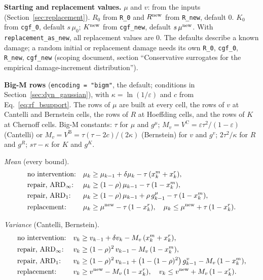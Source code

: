 \textbf{Starting and replacement values.} $\mu$ and $v$: from the inputs
(Section~\ref{sec:replacement}). $R_0$ from \texttt{R\_0} and $R^{\mathrm{new}}$ from
\texttt{R\_new}, default 0. $K_0$ from \texttt{cgf\_0}, default $s\,\mu_0$;
$K^{\mathrm{new}}$ from \texttt{cgf\_new}, default $s\,\mu^{\mathrm{new}}$. With
\texttt{replacement\_as\_new}, all replacement values are 0. The defaults describe a
known damage; a random initial or replacement damage needs its own \texttt{R\_0},
\texttt{cgf\_0}, \texttt{R\_new}, \texttt{cgf\_new} (scoping document, section
``Conservative surrogates for the empirical damage-increment distribution'').

\textbf{Big-M rows} (\texttt{encoding = "bigm"}, the default; conditions in
Section~\ref{sec:dyn_gaussian}), with $\kappa = \ln(1/\varepsilon)$ and $c$ from
Eq.~\eqref{eq:rf_bsupport}. The rows of $\mu$ are built at every cell, the rows of
$v$ at Cantelli and Bernstein cells, the rows of $R$ at Hoeffding cells, and the rows
of $K$ at Chernoff cells. Big-M constants: $\tau$ for $\mu$ and $g^{\mu}$;
$M_v = V^{\mathrm{C}} = \varepsilon\tau^2/(1-\varepsilon)$ (Cantelli) or
$M_v = V^{\mathrm{B}} = \tau(\tau - 2c)/(2\kappa)$ (Bernstein) for $v$ and $g^{v}$;
$2\tau^2/\kappa$ for $R$ and $g^{R}$; $s\tau - \kappa$ for $K$ and $g^{K}$.

\emph{Mean} (every bound).
\begin{align}
  &\text{no intervention:} & \mu_k &\geq \mu_{k-1} + \delta\mu_k - \tau\,(x^m_k + x^r_k),
    \label{eq:rf_mu_carry} \\
  &\text{repair, } \mathrm{ARD}_{\infty}\text{:} & \mu_k &\geq (1-\rho)\,\mu_{k-1} - \tau\,(1 - x^m_k),
    \label{eq:rf_mu_inf} \\
  &\text{repair, } \mathrm{ARD}_{1}\text{:} & \mu_k &\geq (1-\rho)\,\mu_{k-1} + \rho\, g^{\mu}_{k-1}
    - \tau\,(1 - x^m_k),
    \label{eq:rf_mu_one} \\
  &\text{replacement:} & \mu_k &\geq \mu^{\mathrm{new}} - \tau\,(1 - x^r_k), \quad
    \mu_k \leq \mu^{\mathrm{new}} + \tau\,(1 - x^r_k).
    \label{eq:rf_mu_repl}
\end{align}

\emph{Variance} (Cantelli, Bernstein).
\begin{align}
  &\text{no intervention:} & v_k &\geq v_{k-1} + \delta v_k - M_v\,(x^m_k + x^r_k),
    \label{eq:rf_v_carry} \\
  &\text{repair, } \mathrm{ARD}_{\infty}\text{:} & v_k &\geq (1-\rho)^2\, v_{k-1} - M_v\,(1 - x^m_k),
    \label{eq:rf_v_inf} \\
  &\text{repair, } \mathrm{ARD}_{1}\text{:} & v_k &\geq (1-\rho)^2\, v_{k-1}
    + \bigl(1 - (1-\rho)^2\bigr)\, g^{v}_{k-1} - M_v\,(1 - x^m_k),
    \label{eq:rf_v_one} \\
  &\text{replacement:} & v_k &\geq v^{\mathrm{new}} - M_v\,(1 - x^r_k), \quad
    v_k \leq v^{\mathrm{new}} + M_v\,(1 - x^r_k).
    \label{eq:rf_v_repl}
\end{align}

